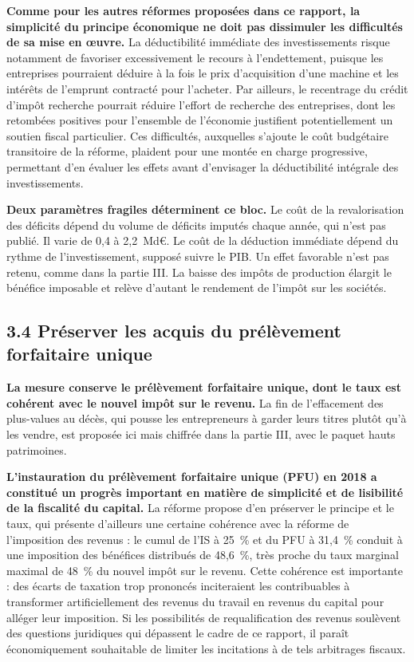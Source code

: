 \documentclass[10pt,a4paper]{article}
\begin{document}
\textbf{Comme pour les autres réformes proposées dans ce rapport, la simplicité du principe économique ne doit pas dissimuler les difficultés de sa mise en œuvre.} La déductibilité immédiate des investissements risque notamment de favoriser excessivement le recours à l’endettement, puisque les entreprises pourraient déduire à la fois le prix d’acquisition d’une machine et les intérêts de l’emprunt contracté pour l’acheter. Par ailleurs, le recentrage du crédit d’impôt recherche pourrait réduire l’effort de recherche des entreprises, dont les retombées positives pour l’ensemble de l’économie justifient potentiellement un soutien fiscal particulier. Ces difficultés, auxquelles s’ajoute le coût budgétaire transitoire de la réforme, plaident pour une montée en charge progressive, permettant d’en évaluer les effets avant d’envisager la déductibilité intégrale des investissements.



\textbf{Deux paramètres fragiles déterminent ce bloc.} Le coût de la revalorisation des déficits dépend du volume de
déficits imputés chaque année, qui n'est pas publié. Il varie de 0,4 à 2,2~Md€. Le coût de la déduction immédiate dépend
du rythme de l'investissement, supposé suivre le PIB. Un effet favorable n'est pas retenu, comme dans la partie III. La
baisse des impôts de production élargit le bénéfice imposable et relève d'autant le rendement de l'impôt sur les sociétés.

\subsection{3.4 Préserver les acquis du prélèvement forfaitaire unique}

\textbf{La mesure conserve le prélèvement forfaitaire unique, dont le taux est cohérent avec le nouvel impôt sur le revenu.} La fin de l'effacement des plus-values au décès, qui pousse les entrepreneurs à garder leurs titres plutôt qu'à les vendre, est proposée ici mais chiffrée dans la partie III, avec le paquet hauts patrimoines.

\textbf{L’instauration du prélèvement forfaitaire unique (PFU) en 2018 a constitué un progrès important en matière de simplicité et de lisibilité de la fiscalité du capital.} La réforme propose d’en préserver le principe et le taux, qui présente d’ailleurs une certaine cohérence avec la réforme de l’imposition des revenus : le cumul de l’IS à 25~\% et du PFU à 31,4~\% conduit à une imposition des bénéfices distribués de 48,6~\%, très proche du taux marginal maximal de 48~\% du nouvel impôt sur le revenu. Cette cohérence est importante : des écarts de taxation trop prononcés inciteraient les contribuables à transformer artificiellement des revenus du travail en revenus du capital pour alléger leur imposition. Si les possibilités de requalification des revenus soulèvent des questions juridiques qui dépassent le cadre de ce rapport, il paraît économiquement souhaitable de limiter les incitations à de tels arbitrages fiscaux.
\end{document}
